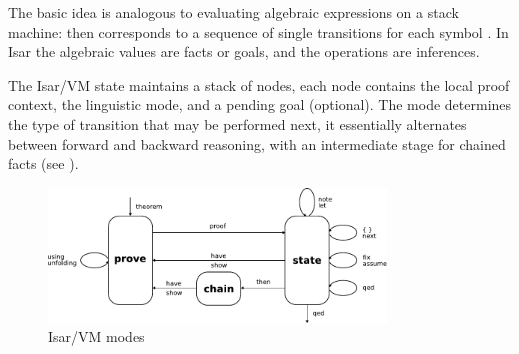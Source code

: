 \begin{isabellebody}
\begin{isamarkuptext}
  The basic idea is analogous to evaluating algebraic expressions on a
  stack machine:  then corresponds to a sequence
  of single transitions for each symbol .
  In Isar the algebraic values are facts or goals, and the operations
  are inferences.

  \medskip The Isar/VM state maintains a stack of nodes, each node
  contains the local proof context, the linguistic mode, and a pending
  goal (optional).  The mode determines the type of transition that
  may be performed next, it essentially alternates between forward and
  backward reasoning, with an intermediate stage for chained facts
  (see ).

  \begin{figure}[htb]
  \begin{center}
  \includegraphics[width=0.8\textwidth]{Thy/document/isar-vm}
  \end{center}
  \caption{Isar/VM modes}\label{fig:isar-vm}
  \end{figure}


\end{isamarkuptext}
\end{isabellebody}
